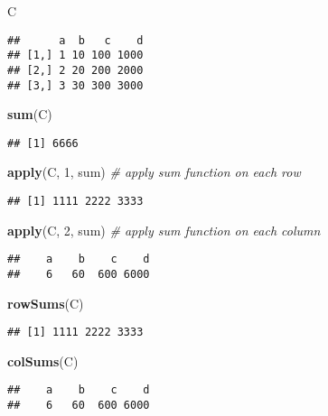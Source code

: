 \documentclass[]{article}
\newenvironment{Shaded}{\begin{snugshade}}{\end{snugshade}}
\newcommand{\KeywordTok}[1]{\textcolor[rgb]{0.13,0.29,0.53}{\textbf{#1}}}
\newcommand{\DecValTok}[1]{\textcolor[rgb]{0.00,0.00,0.81}{#1}}
\newcommand{\CommentTok}[1]{\textcolor[rgb]{0.56,0.35,0.01}{\textit{#1}}}
\newcommand{\NormalTok}[1]{#1}
\begin{document}
\begin{Shaded}
\begin{Highlighting}[]
\NormalTok{C}
\end{Highlighting}
\end{Shaded}

\begin{verbatim}
##      a  b   c    d
## [1,] 1 10 100 1000
## [2,] 2 20 200 2000
## [3,] 3 30 300 3000
\end{verbatim}

\begin{Shaded}
\begin{Highlighting}[]
\KeywordTok{sum}\NormalTok{(C)}
\end{Highlighting}
\end{Shaded}

\begin{verbatim}
## [1] 6666
\end{verbatim}

\begin{Shaded}
\begin{Highlighting}[]
\KeywordTok{apply}\NormalTok{(C, }\DecValTok{1}\NormalTok{, sum) }\CommentTok{# apply sum function on each row}
\end{Highlighting}
\end{Shaded}

\begin{verbatim}
## [1] 1111 2222 3333
\end{verbatim}

\begin{Shaded}
\begin{Highlighting}[]
\KeywordTok{apply}\NormalTok{(C, }\DecValTok{2}\NormalTok{, sum) }\CommentTok{# apply sum function on each column}
\end{Highlighting}
\end{Shaded}

\begin{verbatim}
##    a    b    c    d 
##    6   60  600 6000
\end{verbatim}

\begin{Shaded}
\begin{Highlighting}[]
\KeywordTok{rowSums}\NormalTok{(C)}
\end{Highlighting}
\end{Shaded}

\begin{verbatim}
## [1] 1111 2222 3333
\end{verbatim}

\begin{Shaded}
\begin{Highlighting}[]
\KeywordTok{colSums}\NormalTok{(C)}
\end{Highlighting}
\end{Shaded}

\begin{verbatim}
##    a    b    c    d 
##    6   60  600 6000
\end{verbatim}
\end{document}
